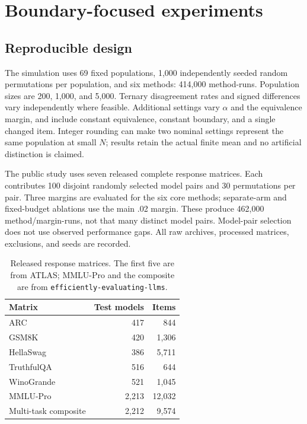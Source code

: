 \section{Boundary-focused experiments}\label{sec:6}\label{boundary-focused-experiments}



\subsection{Reproducible design}\label{reproducible-design}

The simulation uses 69 fixed populations, 1,000 independently seeded random permutations per population, and six methods: 414,000 method-runs. Population sizes are 200, 1,000, and 5,000. Ternary disagreement rates and signed differences vary independently where feasible. Additional settings vary \(\alpha\) and the equivalence margin, and include constant equivalence, constant boundary, and a single changed item. Integer rounding can make two nominal settings represent the same population at small \(N\); results retain the actual finite mean and no artificial distinction is claimed.

The public study uses seven released complete response matrices. Each contributes 100 disjoint randomly selected model pairs and 30 permutations per pair. Three margins are evaluated for the six core methods; separate-arm and fixed-budget ablations use the main .02 margin. These produce 462,000 method/margin-runs, not that many distinct model pairs. Model-pair selection does not use observed performance gaps. All raw archives, processed matrices, exclusions, and seeds are recorded.

\begin{table}[t]
\centering
\caption{Released response matrices. The first five are from ATLAS; MMLU-Pro and the composite are from \texttt{efficiently-evaluating-llms}.}\label{tab:data}
\begin{tabular}{lrr}
\toprule Matrix & Test models & Items\\\midrule
ARC & 417 & 844\\
GSM8K & 420 & 1,306\\
HellaSwag & 386 & 5,711\\
TruthfulQA & 516 & 644\\
WinoGrande & 521 & 1,045\\
MMLU-Pro & 2,213 & 12,032\\
Multi-task composite & 2,212 & 9,574\\\bottomrule
\end{tabular}
\end{table}

